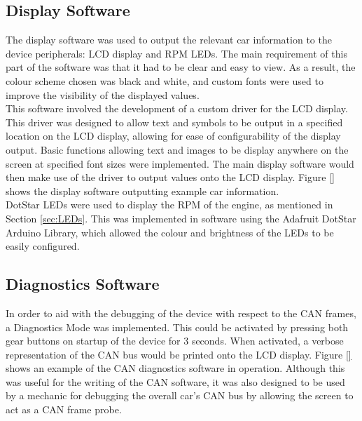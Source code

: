 \documentclass[a4paper,12pt]{article}
\begin{document}
\subsection{Display Software}
\label{sec:display_software}

The display software was used to output the relevant car information to the device peripherals: LCD display and RPM LEDs. The main requirement of this part of the software was that it had to be clear and easy to view. As a result, the colour scheme chosen was black and white, and custom fonts were used to improve the visibility of the displayed values. \\

This software involved the development of a custom driver for the LCD display. This driver was designed to allow text and symbols to be output in a specified location on the LCD display, allowing for ease of configurability of the display output. Basic functions allowing text and images to be display anywhere on the screen at specified font sizes were implemented. The main display software would then make use of the driver to output values onto the LCD display. Figure \ref{} shows the display software outputting example car information. \\



DotStar LEDs were used to display the RPM of the engine, as mentioned in Section \ref{sec:LEDs}. This was implemented in software using the Adafruit DotStar Arduino Library, which allowed the colour and brightness of the LEDs to be easily configured.

\subsection{Diagnostics Software}
\label{sec:diagnostics_software}

In order to aid with the debugging of the device with respect to the CAN frames, a Diagnostics Mode was implemented. This could be activated by pressing both gear buttons on startup of the device for 3 seconds. When activated, a verbose representation of the CAN bus would be printed onto the LCD display. Figure \ref{} shows an example of the CAN diagnostics software in operation. Although this was useful for the writing of the CAN software, it was also designed to be used by a mechanic for debugging the overall car’s CAN bus by allowing the screen to act as a CAN frame probe. \\
\end{document}
